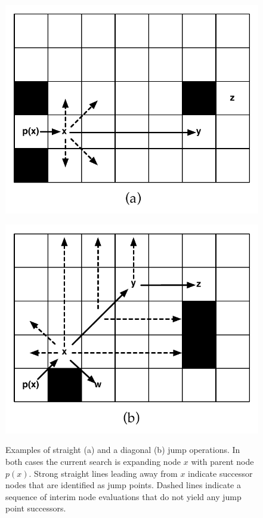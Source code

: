 \begin{figure}[tb]
\centering
\begin{minipage}[tb]{0.49\columnwidth}
		   \includegraphics[width=\columnwidth, trim = 4mm 0mm 0mm 0mm]
			{chapter_jps/diagrams/jump_straight.pdf}
\label{fig::jps::jump_straight}
\end{minipage}
\begin{minipage}[tb]{0.49\columnwidth}
		   \includegraphics[width=\columnwidth, trim = 0mm 0mm 4mm 0mm]
			{chapter_jps/diagrams/jump_diagonal.pdf}
\label{fig::jps::jump_straight}
\end{minipage}
\label{fig::jps::jumppoints}
\vspace{-2em}
\caption[Examples of straight and diagonal jump points]
{\small
Examples of straight (a) and a diagonal (b) jump operations.
In both cases the current search is expanding node $x$ with parent node $p(x)$.
Strong straight lines leading away from $x$ indicate successor nodes that are 
identified as jump points.
Dashed lines indicate a sequence of interim node evaluations that do not yield any
jump point successors.}
\label{fig::jps::jumppoints}
\end{figure}

